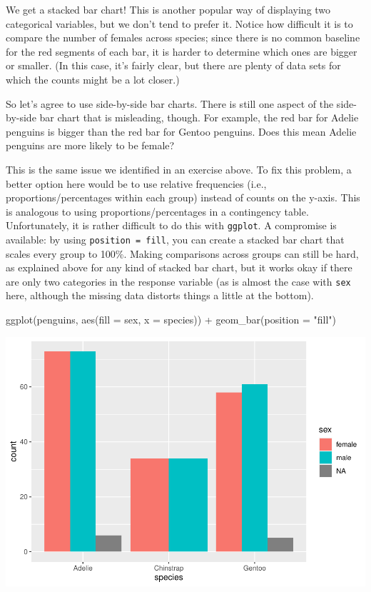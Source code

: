 \documentclass[
]{book}
\newenvironment{Shaded}{\begin{snugshade}}{\end{snugshade}}
\newcommand{\AttributeTok}[1]{\textcolor[rgb]{0.77,0.63,0.00}{#1}}
\newcommand{\FunctionTok}[1]{\textcolor[rgb]{0.00,0.00,0.00}{#1}}
\newcommand{\NormalTok}[1]{#1}
\newcommand{\SpecialCharTok}[1]{\textcolor[rgb]{0.00,0.00,0.00}{#1}}
\newcommand{\StringTok}[1]{\textcolor[rgb]{0.31,0.60,0.02}{#1}}
\begin{document}
We get a stacked bar chart! This is another popular way of displaying two categorical variables, but we don't tend to prefer it. Notice how difficult it is to compare the number of females across species; since there is no common baseline for the red segments of each bar, it is harder to determine which ones are bigger or smaller. (In this case, it's fairly clear, but there are plenty of data sets for which the counts might be a lot closer.)

So let's agree to use side-by-side bar charts. There is still one aspect of the side-by-side bar chart that is misleading, though. For example, the red bar for Adelie penguins is bigger than the red bar for Gentoo penguins. Does this mean Adelie penguins are more likely to be female?

This is the same issue we identified in an exercise above. To fix this problem, a better option here would be to use relative frequencies (i.e., proportions/percentages within each group) instead of counts on the y-axis. This is analogous to using proportions/percentages in a contingency table. Unfortunately, it is rather difficult to do this with \texttt{ggplot}. A compromise is available: by using \texttt{position\ =\ fill}, you can create a stacked bar chart that scales every group to 100\%. Making comparisons across groups can still be hard, as explained above for any kind of stacked bar chart, but it works okay if there are only two categories in the response variable (as is almost the case with \texttt{sex} here, although the missing data distorts things a little at the bottom).

\begin{Shaded}
\begin{Highlighting}[]
\FunctionTok{ggplot}\NormalTok{(penguins, }\FunctionTok{aes}\NormalTok{(}\AttributeTok{fill =}\NormalTok{ sex, }\AttributeTok{x =}\NormalTok{ species)) }\SpecialCharTok{+}
    \FunctionTok{geom\_bar}\NormalTok{(}\AttributeTok{position =} \StringTok{"fill"}\NormalTok{)}
\end{Highlighting}
\end{Shaded}

\includegraphics{intro_stats_files/figure-latex/unnamed-chunk-61-1.pdf}
\end{document}
